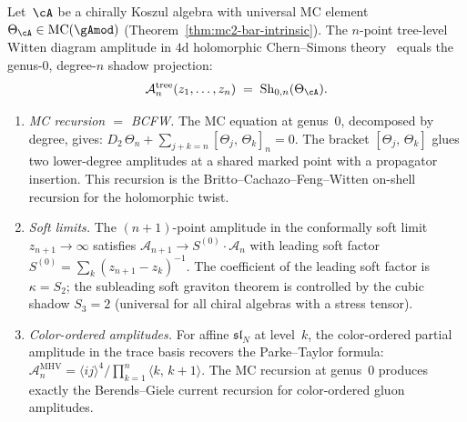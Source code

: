\begin{proposition}
\label{prop:witten-diagram-shadow-projection}
Let~$\cA$ be a chirally Koszul algebra with universal MC element
$\Theta_\cA \in \operatorname{MC}(\gAmod)$
\textup{(}Theorem~\textup{\ref{thm:mc2-bar-intrinsic})}.
The $n$-point tree-level Witten diagram amplitude in $4\mathrm{d}$
holomorphic Chern--Simons theory~\cite{CostelloP2201}
equals the genus-$0$, degree-$n$ shadow projection:
\begin{equation}\label{eq:witten-shadow-identification}
 \mathcal{A}_n^{\mathrm{tree}}(z_1, \ldots, z_n)
 \;=\;
 \mathrm{Sh}_{0,n}(\Theta_\cA).
\end{equation}
\begin{enumerate}[label=\textup{(\roman*)}]
\item \emph{MC recursion $=$ BCFW\@.}
 The MC equation at genus~$0$, decomposed by degree, gives:
 $D_2\,\Theta_n
 + \sum_{j+k=n} [\Theta_j,\, \Theta_k]_n = 0$.
 The bracket $[\Theta_j,\, \Theta_k]$ glues two lower-degree
 amplitudes at a shared marked point with a propagator
 insertion. This recursion is the
 Britto--Cachazo--Feng--Witten on-shell recursion for the
 holomorphic twist.

\item \emph{Soft limits.}
 The $(n{+}1)$-point amplitude in the conformally soft limit
 $z_{n+1} \to \infty$ satisfies
 $\mathcal{A}_{n+1} \to S^{(0)} \cdot \mathcal{A}_n$
 with leading soft factor
 $S^{(0)} = \sum_k (z_{n+1} - z_k)^{-1}$.
 The coefficient of the leading soft factor is
 $\kappa = S_2$\textup{;}
 the subleading soft graviton theorem is controlled by the
 cubic shadow
 $S_3 = 2$
 \textup{(}universal for all chiral algebras with a stress
 tensor\textup{)}.

\item \emph{Color-ordered amplitudes.}
 For affine $\mathfrak{sl}_N$ at level~$k$, the color-ordered
 partial amplitude in the trace basis recovers the
 Parke--Taylor formula:
 $\mathcal{A}_n^{\mathrm{MHV}}
 = \langle ij \rangle^4 / \prod_{k=1}^{n}
 \langle k,\,k{+}1\rangle$.
 The MC recursion at genus~$0$ produces exactly the
 Berends--Giele current recursion for color-ordered gluon
 amplitudes.
\end{enumerate}
\end{proposition}

